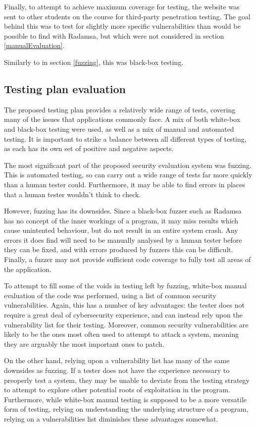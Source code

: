 Finally, to attempt to achieve maximum coverage for testing, the website was sent to other students on the course for third-party penetration testing. The goal behind this was to test for slightly more specific vulnerabilities than would be possible to find with Radamsa, but which were not considered in section \ref{manualEvaluation}.

Similarly to in section \ref{fuzzing}, this was black-box testing. 

\subsection{Testing plan evaluation}

The proposed testing plan provides a relatively wide range of tests, covering many of the issues that applications commonly face. A mix of both white-box and  black-box testing were used, as well as a mix of manual and automated testing. It is important to strike a balance between all different types of testing, as each has its own set of positive and negative aspects. 

The most significant part of the proposed security evaluation system was fuzzing. This is automated testing, so can carry out a wide range of tests far more quickly than a human tester could. Furthermore, it may be able to find errors in places that a human tester wouldn't think to check. 

However, fuzzing has its downsides. Since a black-box fuzzer such as Radamsa has no concept of the inner workings of a program, it may miss results which cause unintented behaviour, but do not result in an entire system crash. Any errors it does find will need to be manually analysed by a human tester before they can be fixed, and with errors produced by fuzzers this can be difficult. Finally, a fuzzer may not provide sufficient code coverage to fully test all areas of the application. 

To attempt to fill some of the voids in testing left by fuzzing, white-box manual evaluation of the code was performed, using a list of common security vulnerabilities. Again, this has a number of key advantages: the tester does not require a great deal of cybersecurity experience, and can instead rely upon the vulnerability list for their testing. Moreover, common security vulnerabilities are likely to be the ones most often used to attempt to attack a system, meaning they are arguably the most important ones to patch. 

On the other hand, relying upon a vulnerability list has many of the same downsides as fuzzing. If a tester does not have the experience necessary to preoperly test a system, they may be unable to deviate from the testing strategy to attempt to explore other potential roots of exploitation in the program. Furthermore, while white-box manual testing is supposed to be a more versatile form of testing, relying on understanding the underlying structure of a program, relying on a vulnerabilities list diminishes these advantages somewhat. 

